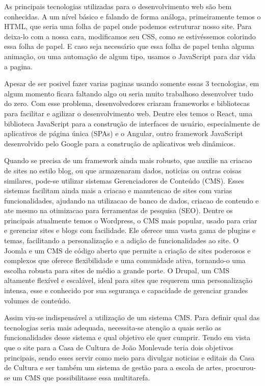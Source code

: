 As principais tecnologias utilizadas para o desenvolvimento web são bem conhecidas. A um nível básico e falando de forma análoga, primeiramente temos o HTML, que seria uma folha de papel onde podemos estruturar nosso site. Para deixa-lo com a nossa cara, modificamos seu CSS, como se estivéssemos colorindo essa folha de papel. E caso seja necessário que essa folha de papel tenha alguma animação, ou uma automação de algum tipo, usamos o JavaScript para dar vida a pagina.

Apesar de ser posivel fazer varias paginas usando somente essas 3 tecnologias, em algum momento ficara faltando algo ou seria muito trabalhoso desenvolver tudo do zero. Com esse problema, desenvolvedores criaram frameworks e bibliotecas para facilitar e agilizar o desenvolvimento web. Dentre eles temos o React, uma biblioteca JavaScript para a construção de interfaces de usuário, especialmente de aplicativos de página única (SPAs) e o Angular, outro framework JavaScript desenvolvido pelo Google para a construção de aplicativos web dinâmicos.

Quando se precisa de um framework ainda mais robusto, que auxilie na criacao de sites no estilo blog, ou que armazenaram dados, noticias ou outras coisas similares, pode-se utilizar sistemas Gerenciadores de Conteúdo (CMS). Esses sistemas facilitam ainda mais a criacao e manutencao de sites com varias funcionalidades, ajudando na utilizacao de banco de dados, criacao de conteudo e ate mesmo na otimizacao para ferramentas de pesquisa (SEO). Dentre os principais atualmente temos o Wordpress, o CMS mais popular, usado para criar e gerenciar sites e blogs com facilidade. Ele oferece uma vasta gama de plugins e temas, facilitando a personalização e a adição de funcionalidades ao site. O Joomla e um CMS de código aberto que permite a criação de sites poderosos e complexos que oferece flexibilidade e uma comunidade ativa, tornando-o uma escolha robusta para sites de médio a grande porte. O Drupal, um CMS altamente flexível e escalável, ideal para sites que requerem uma personalização intensa, esse e conhecido por sua segurança e capacidade de gerenciar grandes volumes de conteúdo.

Assim viu-se indispensável a utilização de um sistema CMS. Para definir qual das tecnologias seria mais adequada, necessita-se atenção a quais serão as funcionalidades desse sistema e qual objetivo ele quer cumprir. Tendo em vista que o site para a Casa de Cultura de João Monlevade teria dois objetivos principais, sendo esses servir como meio para divulgar noticias e editais da Casa de Cultura e ser também um sistema de gestão para a escola de artes, procurou-se um CMS que possibilitasse essa multitarefa.

